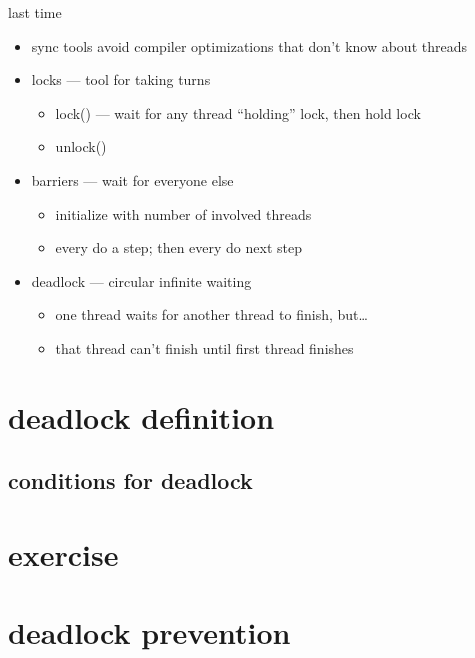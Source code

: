 \documentclass[aspectratio=169]{mytalk}
\title{}
\date{}
\begin{document}


\begin{frame}{last time}
    \begin{itemize}
    \item sync tools avoid compiler optimizations that don't know about threads
    \item locks --- tool for taking turns
        \begin{itemize}
        \item lock() --- wait for any thread ``holding'' lock, then hold lock
        \item unlock()
        \end{itemize}
    \item barriers --- wait for everyone else
        \begin{itemize}
        \item initialize with number of involved threads
        \item every do a step; then every do next step
        \end{itemize}
    \item deadlock --- circular infinite waiting
        \begin{itemize}
        \item one thread waits for another thread to finish, but\ldots
        \item that thread can't finish until first thread finishes
        \end{itemize}
    \end{itemize}
\end{frame}

\section{deadlock definition}


\subsection{conditions for deadlock}



\section{exercise}



\section{deadlock prevention}
\end{document}
